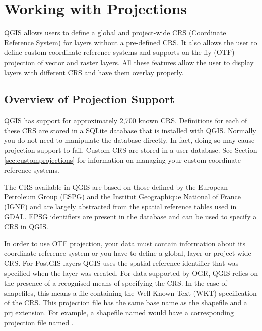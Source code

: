 
\chapter{Working with Projections}\label{label_projections}

\updatedisclaimer

QGIS allows users to define a global and project-wide CRS (Coordinate
Reference System) for layers without a pre-defined CRS. It also allows
the user to define custom coordinate reference systems and supports
on-the-fly (OTF) projection of vector and raster layers. All these
features allow the user to display layers with different CRS and have
them overlay properly.

\section{Overview of Projection Support}\label{label_projoverview}

QGIS has support for approximately 2,700 known CRS. Definitions for
each of these CRS are stored in a SQLite database that is installed with
QGIS. Normally you do not need to manipulate the database directly. In fact,
doing so may cause projection support to fail. Custom CRS are stored in a
user database. See Section \ref{sec:customprojections} for
information on managing your custom coordinate reference systems.

The CRS available in QGIS are based on those defined by the European
Petroleum Group (ESPG) and the Institut Geographique
National of France (IGNF) and are largely abstracted 
from the spatial reference tables used in GDAL. EPSG identifiers are present in the database and can be used
to specify a CRS in QGIS.

In order to use OTF projection, your data must contain information about its
coordinate reference system or you have to define a global, layer or
project-wide CRS. For PostGIS layers QGIS uses the spatial reference
identifier that was specified when the layer was created. For data supported
by OGR, QGIS relies on the presence of a recognised means of specifying
the CRS. In the case of shapefiles, this means a file containing the Well
Known Text (WKT) specification of the CRS. This projection file
has the same base name as the shapefile and a prj extension. For example, a
shapefile named  would have a corresponding projection
file named .

